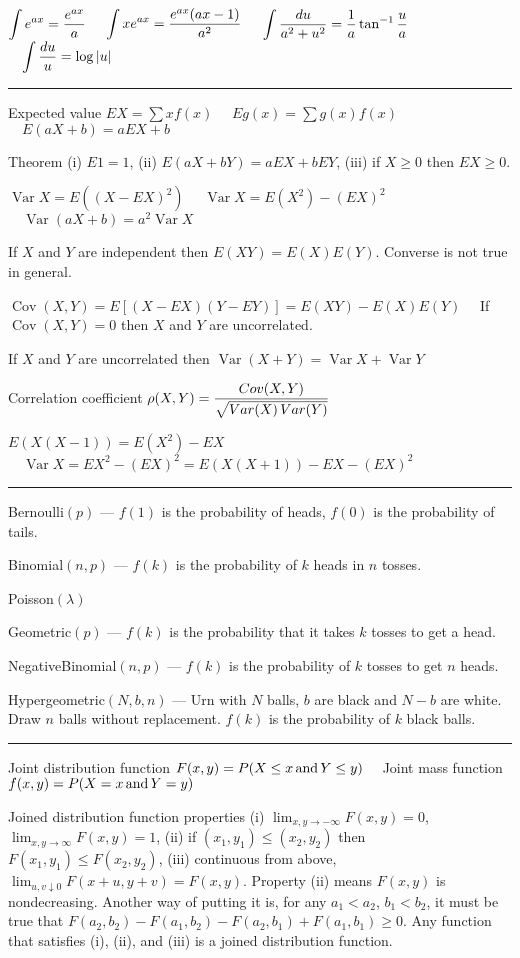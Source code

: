 \smallskip
$\displaystyle \int e^{ax}={e^{ax}\over a}$
$\quad\displaystyle \int xe^{ax}={e^{ax}(ax-1)\over a^2}$
$\quad\displaystyle \int{du\over a^2+u^2}
={1\over a}\tan^{-1}{u\over a}$
$\quad\displaystyle\int {du\over u}=\log|u|$

\smallskip
\hrule

\smallskip
Expected value $EX=\sum xf(x)$
$\quad Eg(x)=\sum g(x)f(x)$
$\quad E(aX+b)=aEX+b$

\smallskip
Theorem (i) $E1=1$, (ii) $E(aX+bY)=aEX+bEY$,
(iii) if $X\ge0$ then $EX\ge0$.

\smallskip
$\mathop{Var}X=E((X-EX)^2)$
$\quad\mathop{Var}X=E(X^2)-(EX)^2$
$\quad\mathop{Var}(aX+b)=a^2\mathop{Var}X$

\smallskip
If $X$ and $Y$ are independent then $E(XY)=E(X)E(Y)$.
Converse is not true in general.

\smallskip
$\mathop{Cov}(X,Y)=E[(X-EX)(Y-EY)]=E(XY)-E(X)E(Y)\quad$
If $\mathop{Cov}(X,Y)=0$ then $X$ and $Y$ are uncorrelated.

\smallskip
If $X$ and $Y$ are uncorrelated then
$\mathop{Var}(X+Y)=\mathop{Var}X+\mathop{Var}Y$

\smallskip
Correlation coefficient
$\displaystyle \rho(X,Y)={\mathop{Cov}(X,Y)
\over\sqrt{\mathop{Var}(X)\mathop{Var}(Y)}}$

\smallskip
$E(X(X-1))=E(X^2)-EX$
$\quad\mathop{Var}X=EX^2-(EX)^2=E(X(X+1))-EX-(EX)^2$

\smallskip
\hrule

\smallskip
Bernoulli$(p)$ ---
$f(1)$ is the probability of heads, $f(0)$ is the probability
of tails.

Binomial$(n,p)$ ---
$f(k)$ is the probability of $k$ heads in $n$ tosses.

Poisson$(\lambda)$

Geometric$(p)$ ---
$f(k)$ is the probability that it takes $k$ tosses to get a head.

NegativeBinomial$(n,p)$ ---
$f(k)$ is the probability of $k$ tosses to get $n$ heads.

Hypergeometric$(N,b,n)$ ---
Urn with $N$ balls, $b$ are black and $N-b$ are white.
Draw $n$ balls without replacement.
$f(k)$ is the probability of $k$ black balls.

\smallskip
\hrule

\smallskip
Joint distribution function
$F(x,y)=P(X\le x\,\hbox{and}\,Y\le y)\quad$
Joint mass function
$f(x,y)=P(X=x\,\hbox{and}\,Y=y)$

\smallskip
Joined distribution function properties
(i) $\lim_{x,y\to-\infty}F(x,y)=0$,
$\lim_{x,y\to\infty}F(x,y)=1$,
(ii) if $(x_1,y_1)\le(x_2,y_2)$ then $F(x_1,y_1)\le F(x_2,y_2)$,
(iii) continuous from above,
$\lim_{u,v\downarrow0}F(x+u,y+v)=F(x,y)$.
Property (ii) means $F(x,y)$ is nondecreasing.
Another way of putting it is, for any $a_1<a_2$, $b_1<b_2$,
it must be true that
$F(a_2,b_2)-F(a_1,b_2)-F(a_2,b_1)+F(a_1,b_1)\ge0$.
Any function that satisfies (i), (ii), and (iii) is a joined
distribution function.

